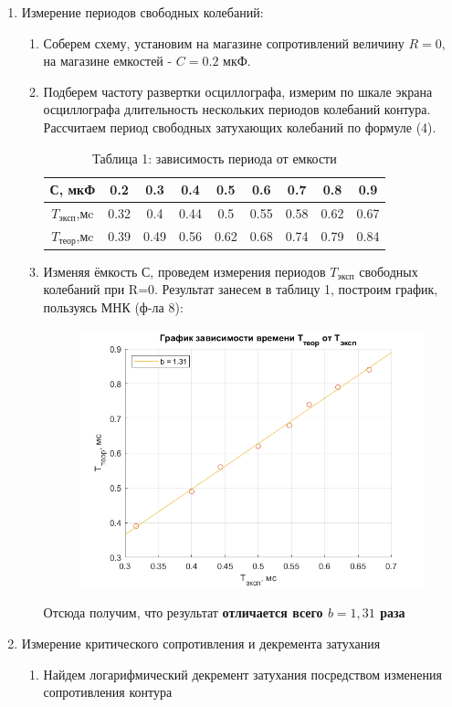 \documentclass[a4paper,12pt]{article}
\begin{document}
\begin{enumerate}
\itemsep0em
\item Измерение периодов свободных колебаний:
\begin{enumerate}
\itemsep0em
\item Соберем схему, установим на магазине сопротивлений величину $R = 0$, на магазине емкостей - $C = 0.2$ мкФ.
\item Подберем частоту развертки осциллографа, измерим по шкале экрана осциллографа длительность нескольких периодов колебаний контура. Рассчитаем период свободных затухающих колебаний по формуле (4).

\begin{table}
\begin{center}
\begin{tabular}{|c|c|c|c|c|c|c|c|c|}
\hline 
С, мкФ & 0.2 & 0.3 & 0.4 & 0.5 & 0.6 & 0.7 & 0.8 & 0.9 \\ 
\hline 
$T_\text{эксп}$,мc & 0.32 & 0.4 & 0.44 & 0.5 & 0.55 & 0.58 & 0.62 & 0.67 \\ 
\hline 
$T_\text{теор}$,мc & 0.39 & 0.49 & 0.56 & 0.62 & 0.68 & 0.74 & 0.79 & 0.84 \\ 
\hline
\end{tabular} 
\caption{Таблица 1: зависимость периода от емкости}
\end{center}
\end{table}
\item Изменяя ёмкость С, проведем измерения периодов $T_\text{эксп}$ свободных колебаний при R=0. Результат занесем в таблицу 1, построим график, пользуясь МНК (ф-ла 8):

\begin{figure}
\begin{center}
\includegraphics[scale=0.6]{graph1.png}
\end{center}
\end{figure}
Отсюда получим, что результат \textbf{отличается всего $b = 1,31$ раза}
\end{enumerate}
\item Измерение критического сопротивления и декремента затухания
\begin{enumerate}
\itemsep0em
\item Найдем логарифмический декремент затухания посредством изменения сопротивления контура


\end{enumerate}
\end{enumerate}
\end{document}
